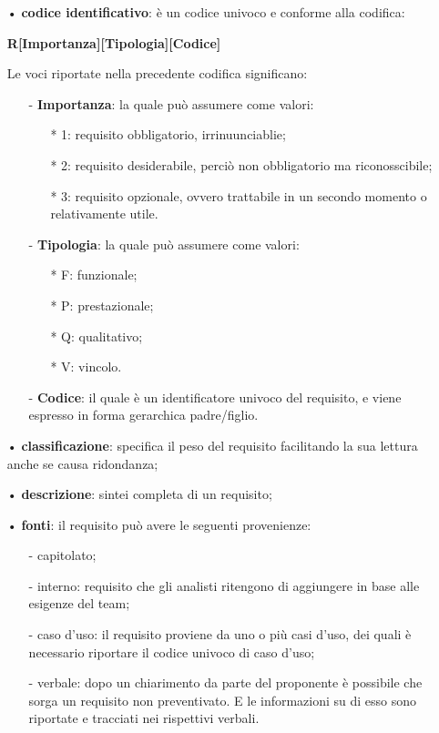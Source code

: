 				\begin{itemize}
					\item[•] \textbf{codice identificativo}: è un codice univoco e conforme alla codifica: \newline \newline
					\centerline{\textbf{R[Importanza][Tipologia][Codice]}} \newline \newline
					Le voci riportate nella precedente codifica significano: 
					\begin{itemize}
						\item[-] \textbf{Importanza}: la quale può assumere come valori:
						\begin{itemize}
							\item[*] 1: requisito obbligatorio, irrinuunciablie;
							\item[*] 2: requisito desiderabile, perciò non obbligatorio ma riconosscibile;
							\item[*] 3: requisito opzionale, ovvero trattabile in un secondo momento o relativamente utile.
						\end{itemize}
						\item[-] \textbf{Tipologia}: la quale può assumere come valori:
						\begin{itemize}
							\item[*] F: funzionale;
							\item[*] P: prestazionale;
							\item[*] Q: qualitativo;
							\item[*] V: vincolo.
						\end{itemize}
						\item[-] \textbf{Codice}: il quale è un identificatore univoco del requisito, e viene espresso in forma gerarchica padre/figlio.
					\end{itemize}
					\item[•] \textbf{classificazione}: specifica il peso del requisito facilitando la sua lettura anche se causa ridondanza;
					\item[•] \textbf{descrizione}: sintei completa di un requisito;
					\item[•] \textbf{fonti}: il requisito può avere le seguenti provenienze:
					\begin{itemize}
						\item[-] capitolato;
						\item[-] interno: requisito che gli analisti ritengono di aggiungere in base alle esigenze del team;
						\item[-] caso d'uso: il requisito proviene da uno o più casi d'uso, dei quali è necessario riportare il codice univoco di caso d'uso;
						\item[-] verbale: dopo un chiarimento da parte del proponente è possibile che sorga un requisito non preventivato. E le informazioni su di esso sono riportate e tracciati nei rispettivi verbali.
					\end{itemize}
				\end{itemize} \newline \newline
